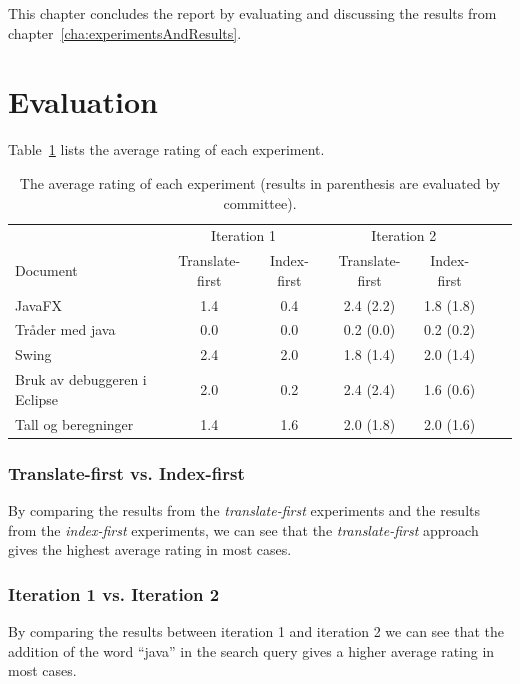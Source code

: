 \documentclass[a4paper]{book}
\begin{document}
This chapter concludes the report by evaluating and discussing the results from chapter~\ref{cha:experimentsAndResults}.

\section{Evaluation}
\label{sec:evaluation}

Table~\ref{tab:averageResults} lists the average rating of each experiment.
\begin{table}[H]
\centering
\begin{tabular}{|l|c|c|c|c|c|c|}
\hline\hline
     & \multicolumn{2}{|c|}{Iteration 1} & \multicolumn{2}{|c|}{Iteration 2} \\
\cline{2-5}
    Document & Translate-first & Index-first & Translate-first & Index-first \\
\hline
    JavaFX                          & 1.4 & 0.4 & 2.4 (2.2) & 1.8 (1.8) \\
    Tråder med java                 & 0.0 & 0.0 & 0.2 (0.0) & 0.2 (0.2) \\
    Swing                           & 2.4 & 2.0 & 1.8 (1.4) & 2.0 (1.4) \\
    Bruk av debuggeren i Eclipse    & 2.0 & 0.2 & 2.4 (2.4) & 1.6 (0.6) \\
    Tall og beregninger             & 1.4 & 1.6 & 2.0 (1.8) & 2.0 (1.6) \\
\hline\hline
\end{tabular}
\caption{The average rating of each experiment (results in parenthesis are evaluated by committee).}
\label{tab:averageResults}
\end{table}

\subsubsection{Translate-first vs. Index-first}

By comparing the results from the \textit{translate-first} experiments and the results from the \textit{index-first} experiments, we can see that the \textit{translate-first} approach gives the highest average rating in most cases.

\subsubsection{Iteration 1 vs. Iteration 2}

By comparing the results between iteration 1 and iteration 2 we can see that the addition of the word ``java'' in the search query gives a higher average rating in most cases.
\end{document}
